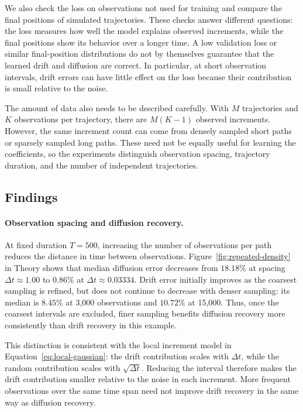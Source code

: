 We also check the loss on observations not used for training and compare
the final positions of simulated trajectories. These checks answer different
questions: the loss measures how well the model explains observed increments,
while the final positions show its behavior over a longer time. A low
validation loss or similar final-position distributions do not by themselves
guarantee that the learned drift and diffusion are correct. In particular,
at short observation intervals, drift errors can have little effect on the
loss because their contribution is small relative to the noise.

The amount of data also needs to be described carefully. With $M$ trajectories
and $K$ observations per trajectory, there are $M(K-1)$ observed increments.
However, the same increment count can come from densely sampled short paths
or sparsely sampled long paths. These need not be equally useful for learning
the coefficients, so the experiments distinguish observation spacing,
trajectory duration, and the number of independent trajectories.

\subsection{Findings}

\paragraph{Observation spacing and diffusion recovery.}

At fixed duration $T=500$, increasing the number of observations per path
reduces the distance in time between observations.
Figure~\ref{fig:repeated-density} in Theory shows that median diffusion error
decreases from $18.18\%$ at spacing $\Delta t\approx1.00$ to $0.86\%$ at
$\Delta t\approx0.03334$. Drift error initially improves as the coarsest
sampling is refined, but does not continue to decrease with denser sampling:
its median is $8.45\%$ at 3,000 observations and $10.72\%$ at 15,000.
Thus, once the coarsest intervals are excluded, finer sampling benefits
diffusion recovery more consistently than drift recovery in this example.

This distinction is consistent with the local increment model in
Equation~\eqref{eq:local-gaussian}: the drift contribution scales with
$\Delta t$, while the random contribution scales with $\sqrt{\Delta t}$.
Reducing the interval therefore makes the drift contribution smaller relative
to the noise in each increment. More frequent observations over the same time
span need not improve drift recovery in the same way as diffusion recovery.

